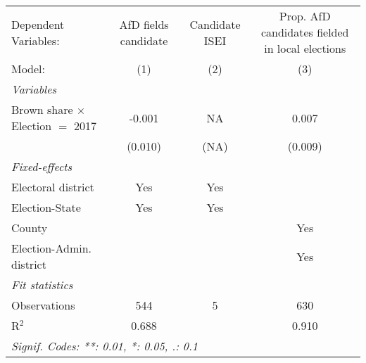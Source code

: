 \begingroup
\centering
\begin{tabular}{lccc}
   \tabularnewline \midrule \midrule
   Dependent Variables:                    & AfD fields candidate & Candidate ISEI & Prop. AfD candidates fielded in local elections\\  
   Model:                                  & (1)                  & (2)            & (3)\\  
   \midrule
   \emph{Variables}\\
   Brown share $\times$ Election $=$ 2017  & -0.001               & NA             & 0.007\\   
                                           & (0.010)              & (NA)           & (0.009)\\   
   \midrule
   \emph{Fixed-effects}\\
   Electoral district                      & Yes                  & Yes            & \\  
   Election-State                          & Yes                  & Yes            & \\  
   County                                  &                      &                & Yes\\  
   Election-Admin. district                &                      &                & Yes\\  
   \midrule
   \emph{Fit statistics}\\
   Observations                            & 544                  & 5              & 630\\  
   R$^2$                                   & 0.688                &                & 0.910\\  
   \midrule \midrule
   \multicolumn{4}{l}{\emph{Signif. Codes: **: 0.01, *: 0.05, .: 0.1}}\\
\end{tabular}
\par\endgroup



